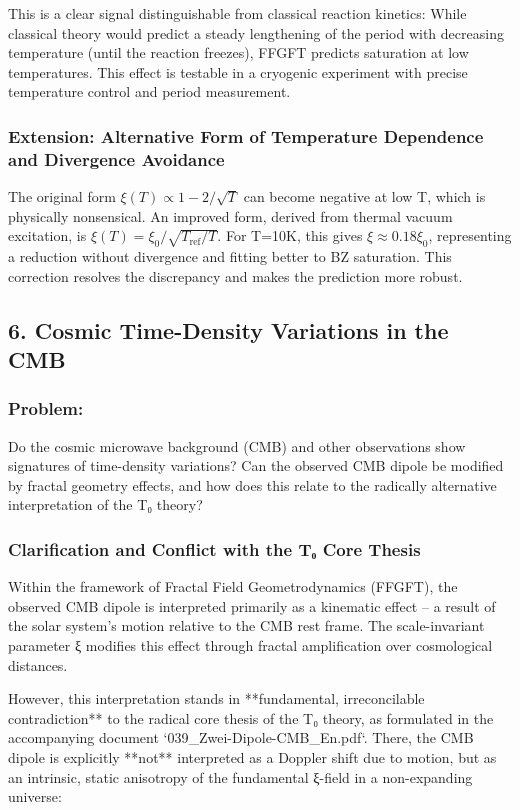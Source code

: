 \documentclass[12pt,a4paper]{article}
\begin{document}
	This is a clear signal distinguishable from classical reaction kinetics: While classical theory would predict a steady lengthening of the period with decreasing temperature (until the reaction freezes), FFGFT predicts saturation at low temperatures. This effect is testable in a cryogenic experiment with precise temperature control and period measurement.
	
	\subsubsection*{Extension: Alternative Form of Temperature Dependence and Divergence Avoidance}
	The original form $\xi(T) \propto 1 - 2/\sqrt{T}$ can become negative at low T, which is physically nonsensical. An improved form, derived from thermal vacuum excitation, is $\xi(T) = \xi_0 / \sqrt{T_{\text{ref}}/T}$. For T=10K, this gives $\xi \approx 0.18 \xi_0$, representing a reduction without divergence and fitting better to BZ saturation. This correction resolves the discrepancy and makes the prediction more robust.
	
	\subsection*{6. Cosmic Time-Density Variations in the CMB}
	
	\subsubsection*{Problem:}
	Do the cosmic microwave background (CMB) and other observations show signatures of time-density variations? Can the observed CMB dipole be modified by fractal geometry effects, and how does this relate to the radically alternative interpretation of the T₀ theory?
	
	\subsubsection*{Clarification and Conflict with the T₀ Core Thesis}
	
	Within the framework of Fractal Field Geometrodynamics (FFGFT), the observed CMB dipole is interpreted primarily as a kinematic effect – a result of the solar system's motion relative to the CMB rest frame. The scale-invariant parameter ξ modifies this effect through fractal amplification over cosmological distances.
	
	However, this interpretation stands in **fundamental, irreconcilable contradiction** to the radical core thesis of the T₀ theory, as formulated in the accompanying document `039\_Zwei-Dipole-CMB\_En.pdf`. There, the CMB dipole is explicitly **not** interpreted as a Doppler shift due to motion, but as an intrinsic, static anisotropy of the fundamental ξ-field in a non-expanding universe:
	
\end{document}
